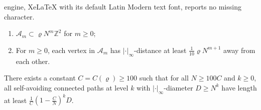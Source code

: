 \documentclass[10pt,a4paper]{amsart}
\begin{document}
engine, XeLaTeX with its default Latin Modern text font, reports no missing character.
\begin{enumerate}
    \item \label{condition:fractal-1} $\mathcal{A}_m \subset \varrho N^m \mathbb{Z}^2$ for $m \geq 0$;
    
    \item \label{condition:fractal-2} For $m \geq 0$, each vertex in $\mathcal{A}_m$ has $|\cdot|_\infty$-distance at least $\frac{1}{10} \varrho N^{m+1}$ away from each other.
\end{enumerate}

\begin{lemma}\label{lem:length-bound}
    There exists a constant $C = C(\varrho) \geq 100$ such that for all $N \geq 100 C$ and $k \geq 0$, all self-avoiding connected paths at level $k$ with $|\cdot|_\infty$-diameter $D \geq N^k$ have length at least $\frac{1}{C}(1 - \frac{C}{N})^kD$.
\end{lemma}
\end{document}
